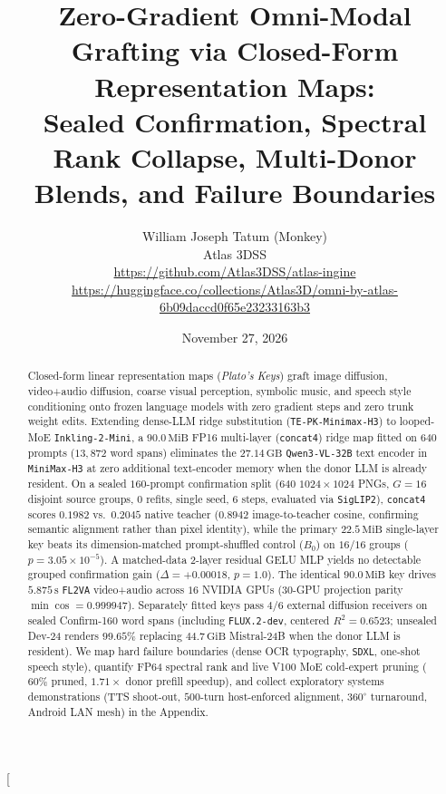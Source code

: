 \documentclass[10pt,twocolumn]{article}
\title{\vspace{-1.3em}\Large\bfseries Zero-Gradient Omni-Modal Grafting via Closed-Form Representation Maps:\\
Sealed Confirmation, Spectral Rank Collapse, Multi-Donor Blends, and Failure Boundaries}
\author{William Joseph Tatum (Monkey)\footnotemark[1]\\
\small Atlas 3DSS\\
\small\url{https://github.com/Atlas3DSS/atlas-ingine}\\
\small\url{https://huggingface.co/collections/Atlas3D/omni-by-atlas-6b09daccd0f65e23233163b3}}
\date{November 27, 2026}
\begin{document}
\twocolumn[
\begin{@twocolumnfalse}
\maketitle
\vspace{-1.3em}
\begin{abstract}
\noindent
Closed-form linear representation maps (\emph{Plato's Keys}) graft image diffusion, video+audio diffusion, coarse visual perception, symbolic music, and speech style conditioning onto frozen language models with zero gradient steps and zero trunk weight edits. Extending dense-LLM ridge substitution (\texttt{TE-PK-Minimax-H3}) to looped-MoE \texttt{Inkling-2-Mini}, a $90.0\,\text{MiB}$ FP16 multi-layer (\texttt{concat4}) ridge map fitted on $640$ prompts ($13{,}872$ word spans) eliminates the $27.14\,\text{GB}$ \texttt{Qwen3-VL-32B} text encoder in \texttt{MiniMax-H3} at zero additional text-encoder memory when the donor LLM is already resident. On a sealed $160$-prompt confirmation split ($640$ $1024\times 1024$ PNGs, $G=16$ disjoint source groups, $0$ refits, single seed, 6 steps, evaluated via \texttt{SigLIP2}), \texttt{concat4} scores $0.1982$ vs.\ $0.2045$ native teacher ($0.8942$ image-to-teacher cosine, confirming semantic alignment rather than pixel identity), while the primary $22.5\,\text{MiB}$ single-layer key beats its dimension-matched prompt-shuffled control ($B_0$) on $16/16$ groups ($p=3.05\times 10^{-5}$). A matched-data 2-layer residual GELU MLP yields no detectable grouped confirmation gain ($\Delta=+0.00018$, $p=1.0$). The identical $90.0\,\text{MiB}$ key drives $5.875\,\text{s}$ \texttt{FL2VA} video+audio across $16$ NVIDIA GPUs ($30$-GPU projection parity $\min\cos=0.999947$). Separately fitted keys pass $4/6$ external diffusion receivers on sealed Confirm-160 word spans (including \texttt{FLUX.2-dev}, centered $R^2=0.6523$; unsealed Dev-24 renders $99.65\%$ replacing $44.7\,\text{GiB}$ Mistral-24B when the donor LLM is resident). We map hard failure boundaries (dense OCR typography, \texttt{SDXL}, one-shot speech style), quantify FP64 spectral rank and live V100 MoE cold-expert pruning ($60\%$ pruned, $1.71\times$ donor prefill speedup), and collect exploratory systems demonstrations (TTS shoot-out, $500$-turn host-enforced alignment, $360^\circ$ turnaround, Android LAN mesh) in the Appendix.
\end{abstract}
\vspace{0.55em}
\begin{center}
\end{center}
\end{@twocolumnfalse}
\end{document}
